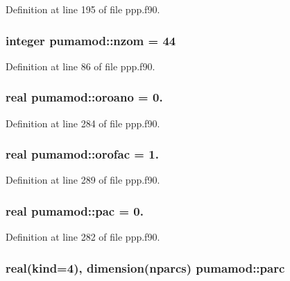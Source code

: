 \-Definition at line 195 of file ppp.\-f90.

\hypertarget{classpumamod_a92c91c6f6d1af535729b74c33c515e87}{
\subsubsection[{nzom}]{\setlength{\rightskip}{0pt plus 5cm}integer {\bf pumamod\-::nzom} = 44}}
\label{classpumamod_a92c91c6f6d1af535729b74c33c515e87}


\-Definition at line 86 of file ppp.\-f90.

\hypertarget{classpumamod_aa50284698e4f6c0677ad8674c812a287}{
\subsubsection[{oroano}]{\setlength{\rightskip}{0pt plus 5cm}real {\bf pumamod\-::oroano} = 0.}}
\label{classpumamod_aa50284698e4f6c0677ad8674c812a287}


\-Definition at line 284 of file ppp.\-f90.

\hypertarget{classpumamod_abc7fb7a57043486f15c7aca03158fb2f}{
\subsubsection[{orofac}]{\setlength{\rightskip}{0pt plus 5cm}real {\bf pumamod\-::orofac} = 1.}}
\label{classpumamod_abc7fb7a57043486f15c7aca03158fb2f}


\-Definition at line 289 of file ppp.\-f90.

\hypertarget{classpumamod_a7784d994e8d1702725dd2241891c1405}{
\subsubsection[{pac}]{\setlength{\rightskip}{0pt plus 5cm}real {\bf pumamod\-::pac} = 0.}}
\label{classpumamod_a7784d994e8d1702725dd2241891c1405}


\-Definition at line 282 of file ppp.\-f90.

\hypertarget{classpumamod_ae2c4727393fa343e9b1bc8a3c74aaadc}{
\subsubsection[{parc}]{\setlength{\rightskip}{0pt plus 5cm}real(kind=4), dimension(nparcs) {\bf pumamod\-::parc}}}
\label{classpumamod_ae2c4727393fa343e9b1bc8a3c74aaadc}


